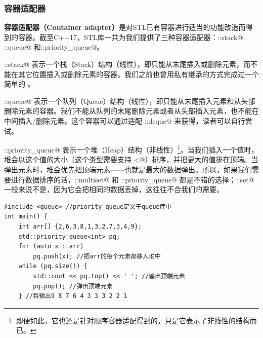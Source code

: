 \subsubsection*{容器适配器}
\textbf{容器适配器（Container adapter）}是对STL已有容器进行适当的功能改造而得到的容器。截至C++17，STL库一共为我们提供了三种容器适配器：\lstinline@std::stack@, \lstinline@std::queue@ 和\newline\lstinline@std::priority_queue@。\par
\lstinline@std::stack@ 表示一个栈（Stack）结构（线性），即只能从末尾插入或删除元素，而不能在其它位置插入或删除元素的容器。我们之前也曾用私有继承的方式完成过一个简单的 \lstinline@stack@。\par
\lstinline@std::queue@ 表示一个队列（Queue）结构（线性），即只能从末尾插入元素和从头部删除元素的容器。我们不能从队列的末尾删除元素或者从头部插入元素，也不能在中间插入/删除元素。这个容器可以通过适配 \lstinline@std::deque@ 来获得，读者可以自行尝试。\par
\lstinline@std::priority_queue@ 表示一个堆（Heap）结构（非线性）\footnote{即便如此，它也还是针对顺序容器适配得到的，只是它表示了非线性的结构而已。}。当我们插入一个值时，堆会以这个值的大小（这个类型需要支持 \lstinline@<@）排序，并把更大的值排在顶端。当弹出元素时，堆会优先把顶端元素——也就是最大的数据弹出。所以，如果我们需要进行数据排序的话，\lstinline@std::multiset@ 和 \lstinline@std::priority_queue@ 都是不错的选择；\lstinline@std::set@ 一般来说不是，因为它会把相同的数据丢掉，这往往不合我们的需要。
\begin{lstlisting}
#include <queue> //priority_queue定义于queue库中
int main() {
    int arr[] {2,6,3,8,1,3,2,7,3,4,9};
    std::priority_queue<int> pq;
    for (auto x : arr)
        pq.push(x); //把arr的每个元素都移入堆中
    while (pq.size()) {
        std::cout << pq.top() << ' '; //输出顶端元素
        pq.pop(); //弹出顶端元素
    } //将输出9 8 7 6 4 3 3 3 2 2 1
\end{lstlisting}\par
